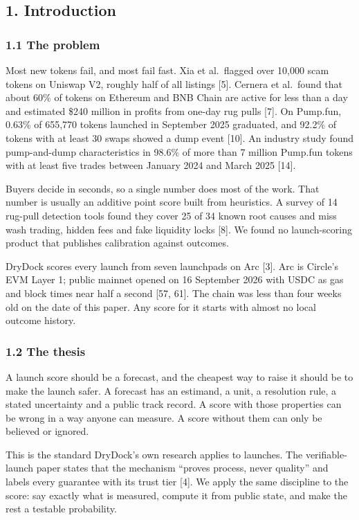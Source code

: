 \subsection{1. Introduction}\label{introduction}

\subsubsection{1.1 The problem}\label{the-problem}

Most new tokens fail, and most fail fast. Xia et al.~flagged over 10,000 scam tokens on Uniswap V2, roughly half of all listings {[}5{]}. Cernera et al.~found that about 60\% of tokens on Ethereum and BNB Chain are active for less than a day and estimated \$240 million in profits from one-day rug pulls {[}7{]}. On Pump.fun, 0.63\% of 655,770 tokens launched in September 2025 graduated, and 92.2\% of tokens with at least 30 swaps showed a dump event {[}10{]}. An industry study found pump-and-dump characteristics in 98.6\% of more than 7 million Pump.fun tokens with at least five trades between January 2024 and March 2025 {[}14{]}.

Buyers decide in seconds, so a single number does most of the work. That number is usually an additive point score built from heuristics. A survey of 14 rug-pull detection tools found they cover 25 of 34 known root causes and miss wash trading, hidden fees and fake liquidity locks {[}8{]}. We found no launch-scoring product that publishes calibration against outcomes.

DryDock scores every launch from seven launchpads on Arc {[}3{]}. Arc is Circle's EVM Layer 1; public mainnet opened on 16 September 2026 with USDC as gas and block times near half a second {[}57, 61{]}. The chain was less than four weeks old on the date of this paper. Any score for it starts with almost no local outcome history.

\subsubsection{1.2 The thesis}\label{the-thesis}

A launch score should be a forecast, and the cheapest way to raise it should be to make the launch safer. A forecast has an estimand, a unit, a resolution rule, a stated uncertainty and a public track record. A score with those properties can be wrong in a way anyone can measure. A score without them can only be believed or ignored.

This is the standard DryDock's own research applies to launches. The verifiable-launch paper states that the mechanism ``proves process, never quality'' and labels every guarantee with its trust tier {[}4{]}. We apply the same discipline to the score: say exactly what is measured, compute it from public state, and make the rest a testable probability.

